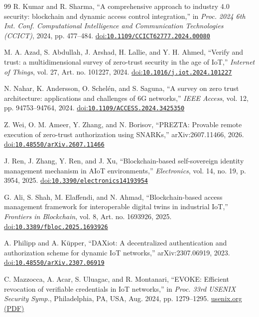 \begin{thebibliography}{99}
R. Kumar and R. Sharma, ``A comprehensive approach to industry 4.0 security: blockchain and dynamic access control integration,'' in \emph{Proc. 2024 6th Int. Conf. Computational Intelligence and Communication Technologies (CCICT)}, 2024, pp. 477--484. \href{https://doi.org/10.1109/CCICT62777.2024.00080}{doi:\nolinkurl{10.1109/CCICT62777.2024.00080}}

M. A. Azad, S. Abdullah, J. Arshad, H. Lallie, and Y. H. Ahmed, ``Verify and trust: a multidimensional survey of zero-trust security in the age of IoT,'' \emph{Internet of Things}, vol. 27, Art. no. 101227, 2024. \href{https://doi.org/10.1016/j.iot.2024.101227}{doi:\nolinkurl{10.1016/j.iot.2024.101227}}

N. Nahar, K. Andersson, O. Schel\'en, and S. Saguna, ``A survey on zero trust architecture: applications and challenges of 6G networks,'' \emph{IEEE Access}, vol. 12, pp. 94753--94764, 2024. \href{https://doi.org/10.1109/ACCESS.2024.3425350}{doi:\nolinkurl{10.1109/ACCESS.2024.3425350}}

Z. Wei, O. M. Ameer, Y. Zhang, and N. Borisov, ``PREZTA: Provable remote execution of zero-trust authorization using SNARKs,'' arXiv:2607.11466, 2026. \href{https://doi.org/10.48550/arXiv.2607.11466}{doi:\nolinkurl{10.48550/arXiv.2607.11466}}

J. Ren, J. Zhang, Y. Ren, and J. Xu, ``Blockchain-based self-sovereign identity management mechanism in AIoT environments,'' \emph{Electronics}, vol. 14, no. 19, p. 3954, 2025. \href{https://doi.org/10.3390/electronics14193954}{doi:\nolinkurl{10.3390/electronics14193954}}

G. Ali, S. Shah, M. Elaffendi, and N. Ahmad, ``Blockchain-based access management framework for interoperable digital twins in industrial IoT,'' \emph{Frontiers in Blockchain}, vol. 8, Art. no. 1693926, 2025. \href{https://doi.org/10.3389/fbloc.2025.1693926}{doi:\nolinkurl{10.3389/fbloc.2025.1693926}}

A. Philipp and A. K\"upper, ``DAXiot: A decentralized authentication and authorization scheme for dynamic IoT networks,'' arXiv:2307.06919, 2023. \href{https://doi.org/10.48550/arXiv.2307.06919}{doi:\nolinkurl{10.48550/arXiv.2307.06919}}

C. Mazzocca, A. Acar, S. Uluagac, and R. Montanari, ``EVOKE: Efficient revocation of verifiable credentials in IoT networks,'' in \emph{Proc. 33rd USENIX Security Symp.}, Philadelphia, PA, USA, Aug. 2024, pp. 1279--1295. \href{https://www.usenix.org/system/files/usenixsecurity24-mazzocca.pdf}{usenix.org (PDF)}


\end{thebibliography}
